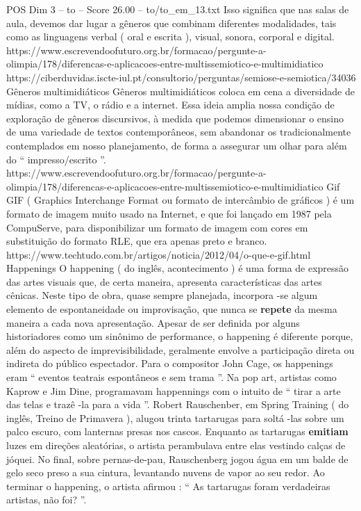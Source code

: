 \begin{textsample}{POS Dim 3 – to – Score 26.00 – to/to\_em\_13.txt}
Isso significa que nas salas de aula, devemos dar lugar a gêneros que combinam diferentes modalidades, tais como as linguagens verbal ( oral e escrita ), visual, sonora, corporal e digital. https://www.escrevendoofuturo.org.br/formacao/pergunte-a-olimpia/178/diferencas-e-aplicacoes-entre-multissemiotico-e-multimidiatico https://ciberduvidas.iscte-iul.pt/consultorio/perguntas/semiose-e-semiotica/34036 Gêneros multimidiáticos Gêneros multimidiáticos coloca em cena a diversidade de mídias, como a TV, o rádio e a internet.
Essa ideia amplia nossa condição de exploração de gêneros discursivos, à medida que podemos dimensionar o ensino de uma variedade de textos contemporâneos, sem abandonar os tradicionalmente contemplados em nosso planejamento, de forma a assegurar um olhar para além do “ impresso/escrito ”. https://www.escrevendoofuturo.org.br/formacao/pergunte-a-olimpia/178/diferencas-e-aplicacoes-entre-multissemiotico-e-multimidiatico Gif GIF ( Graphics Interchange Format ou formato de intercâmbio de gráficos ) é um formato de imagem muito usado na Internet, e que foi lançado em 1987 pela CompuServe, para disponibilizar um formato de imagem com cores em substituição do formato RLE, que era apenas preto e branco. https://www.techtudo.com.br/artigos/noticia/2012/04/o-que-e-gif.html Happenings O happening ( do inglês, acontecimento ) é uma forma de expressão das artes visuais que, de certa maneira, apresenta características das artes cênicas.
Neste tipo de obra, quase sempre planejada, incorpora -se algum elemento de espontaneidade ou improvisação, que nunca se \textbf{repete} da mesma maneira a cada nova apresentação.
Apesar de ser definida por alguns historiadores como um sinônimo de performance, o happening é diferente porque, além do aspecto de imprevisibilidade, geralmente envolve a participação direta ou indireta do público espectador.
Para o compositor John Cage, os happenings eram “ eventos teatrais espontâneos e sem trama ”.
Na pop art, artistas como Kaprow e Jim Dine, programavam happennings com o intuito de “ tirar a arte das telas e trazê -la para a vida ”.
Robert Rauschenber, em Spring Training ( do inglês, Treino de Primavera ), alugou trinta tartarugas para soltá -las sobre um palco escuro, com lanternas presas nos cascos.
Enquanto as tartarugas \textbf{emitiam} luzes em direções aleatórias, o artista perambulava entre elas vestindo calças de jóquei.
No final, sobre pernas-de-pau, Rauschenberg jogou água em um balde de gelo seco preso a sua cintura, levantando nuvens de vapor ao seu redor.
Ao terminar o happening, o artista afirmou : “ As tartarugas foram verdadeiras artistas, não foi? ”.

\end{textsample}
